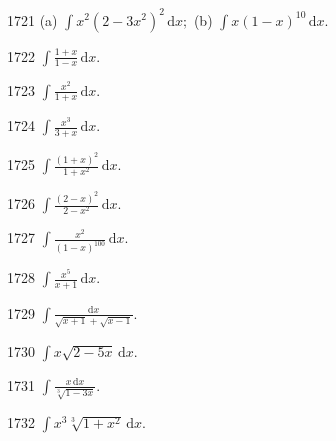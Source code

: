 \begin{prob}[M]{1721}
(a) $\displaystyle\int x^2(2 - 3x^2)^2\,\mathrm{d}x;$ \qquad (b) $\displaystyle\int x(1 - x)^{10}\,\mathrm{d}x.$
\end{prob}

\begin{prob}[S]{1722}
$\displaystyle\int \frac{1 + x}{1 - x}\,\mathrm{d}x.$
\end{prob}

\begin{prob}[S]{1723}
$\displaystyle\int \frac{x^2}{1 + x}\,\mathrm{d}x.$
\end{prob}

\begin{prob}[S]{1724}
$\displaystyle\int \frac{x^3}{3 + x}\,\mathrm{d}x.$
\end{prob}

\begin{prob}[S]{1725}
$\displaystyle\int \frac{(1 + x)^2}{1 + x^2}\,\mathrm{d}x.$
\end{prob}

\begin{prob}[S]{1726}
$\displaystyle\int \frac{(2 - x)^2}{2 - x^2}\,\mathrm{d}x.$
\end{prob}

\begin{prob}[S]{1727}
$\displaystyle\int \frac{x^2}{(1 - x)^{100}}\,\mathrm{d}x.$
\end{prob}

\begin{prob}[S]{1728}
$\displaystyle\int \frac{x^5}{x + 1}\,\mathrm{d}x.$
\end{prob}

\begin{prob}[S]{1729}
$\displaystyle\int \frac{\mathrm{d}x}{\sqrt{x + 1} + \sqrt{x - 1}}.$
\end{prob}

\begin{prob}[S]{1730}
$\displaystyle\int x\sqrt{2 - 5x}\,\mathrm{d}x.$
\end{prob}

\begin{prob}[S]{1731}
$\displaystyle\int \frac{x\,\mathrm{d}x}{\sqrt[3]{1 - 3x}}.$
\end{prob}

\begin{prob}[S]{1732}
$\displaystyle\int x^3\sqrt[3]{1 + x^2}\,\mathrm{d}x.$
\end{prob}

